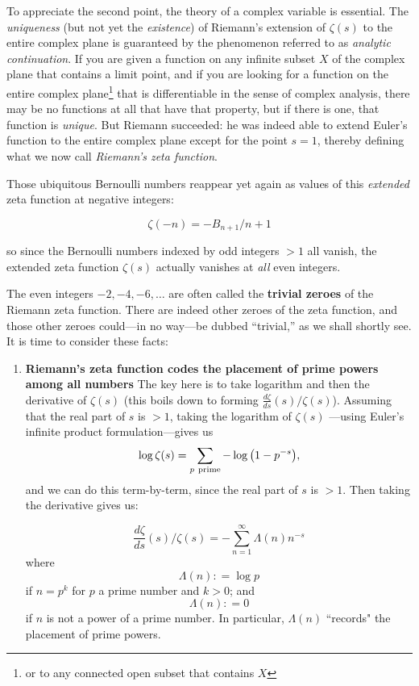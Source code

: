 \documentclass[openany]{book}
\theoremstyle{plain}
\theoremstyle{definition}
\begin{document}
{{{To appreciate the second point, the theory of a complex variable is
essential. The {\it uniqueness} (but not yet the {\it existence}) of
Riemann's extension of $\zeta(s)$ to the entire complex plane is
guaranteed by the phenomenon referred to as {\it analytic
  continuation}.  If you are given a function on any infinite subset
$X$ of the complex plane that contains a limit point, and if you are
looking for a function on the entire complex plane{\footnote{ or to
    any connected open subset that contains $X$}} that is
differentiable in the sense of complex analysis, there may be no
functions at all that have that property, but if there is one, that
function is {\it unique}.  But Riemann succeeded: he was indeed able
to extend Euler's function to the entire complex plane except for the
point $s=1$, thereby defining what we now call {\it Riemann's zeta
  function}.  \vskip20pt

 Those ubiquitous Bernoulli numbers reappear yet again as
 values of this {\it extended} zeta function at negative integers:

  $$\zeta(-n) = -B_{n+1}/n+1$$

  so since the Bernoulli numbers indexed by odd integers $>1$ all
  vanish, the extended zeta function $\zeta(s)$ actually vanishes at
  {\it all} even integers.

  The even integers $-2, -4, -6, \dots$ are often called the {\bf
    trivial zeroes} of the Riemann zeta function.  There are indeed
  other zeroes of the zeta function, and those other zeroes could---in no way---be
  dubbed ``trivial,'' as we shall shortly see.\vskip20pt It is time to
  consider these facts:

  \begin{enumerate}\item {\bf Riemann's zeta function codes the
      placement of prime powers among all numbers} The key here is to
    take logarithm and then the derivative of $\zeta(s)$ (this boils
    down to forming ${\frac{d{\zeta}}{ds}}(s)/\zeta(s)$). Assuming
    that the real part of $s$ is $>1$, taking the logarithm of
    $\zeta(s)$ ---using Euler's infinite product formulation---gives
    us $$\log\zeta(s)= \sum_{p \ {\rm
        prime}}-\log{\big(1-p^{-s}\big)},$$ and we can do this
    term-by-term, since the real part of $s$ is $>1$.  Then taking the
    derivative gives us:

  \vskip20pt
   $${\frac{d{\zeta}}{ds}}(s)/\zeta(s)= -\sum_{n=1}^{\infty}\Lambda(n)n^{-s}$$ where  $$\Lambda(n): = \log p$$ if $n= p^k$ for $p$ a prime number and $k >0$;  and  $$\Lambda(n): = 0$$ if $n$ is not a power of a prime number.  In particular,  $\Lambda(n)$ ``records" the placement of prime powers.


\end{enumerate}}}}
\end{document}
